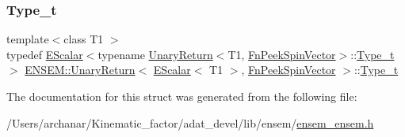 \subsubsection{\texorpdfstring{Type\_t}{Type\_t}\hspace{0.1cm}{\footnotesize\ttfamily [2/2]}}
{\footnotesize\ttfamily template$<$class T1 $>$ \\
typedef \mbox{\hyperlink{classENSEM_1_1EScalar}{E\+Scalar}}$<$typename \mbox{\hyperlink{structENSEM_1_1UnaryReturn}{Unary\+Return}}$<$T1, \mbox{\hyperlink{structENSEM_1_1FnPeekSpinVector}{Fn\+Peek\+Spin\+Vector}}$>$\+::\mbox{\hyperlink{structENSEM_1_1UnaryReturn_3_01EScalar_3_01T1_01_4_00_01FnPeekSpinVector_01_4_ab36dc210813249d571d0447c7da504ac}{Type\+\_\+t}}$>$ \mbox{\hyperlink{structENSEM_1_1UnaryReturn}{E\+N\+S\+E\+M\+::\+Unary\+Return}}$<$ \mbox{\hyperlink{classENSEM_1_1EScalar}{E\+Scalar}}$<$ T1 $>$, \mbox{\hyperlink{structENSEM_1_1FnPeekSpinVector}{Fn\+Peek\+Spin\+Vector}} $>$\+::\mbox{\hyperlink{structENSEM_1_1UnaryReturn_3_01EScalar_3_01T1_01_4_00_01FnPeekSpinVector_01_4_ab36dc210813249d571d0447c7da504ac}{Type\+\_\+t}}}



The documentation for this struct was generated from the following file\+:\begin{DoxyCompactItemize}
\item 
/\+Users/archanar/\+Kinematic\+\_\+factor/adat\+\_\+devel/lib/ensem/\mbox{\hyperlink{lib_2ensem_2ensem__ensem_8h}{ensem\+\_\+ensem.\+h}}\end{DoxyCompactItemize}
